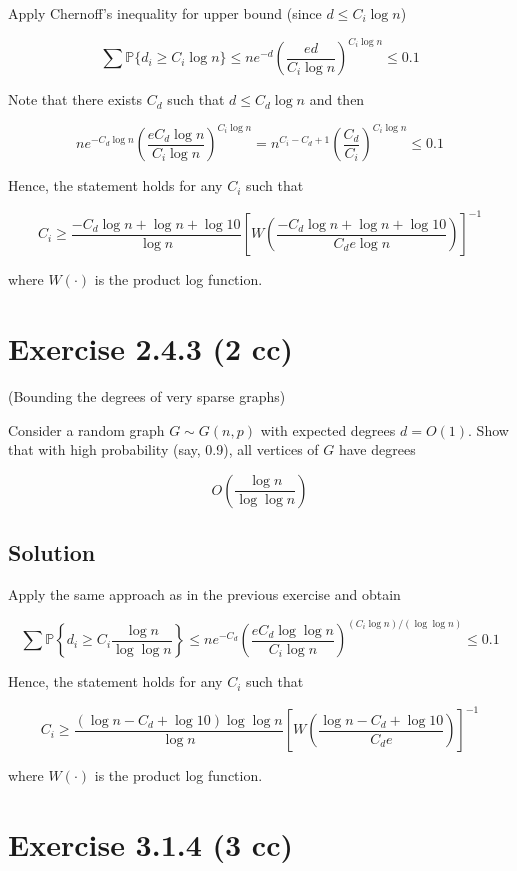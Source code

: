 \documentclass{article}
\begin{document}
Apply Chernoff’s inequality for upper bound (since $d \leq C_i \log n$)

$$ \sum \mathbb P \{ d_i \geq C_i \log n \} \leq n e^{-d} \left(\frac{e d}{C_i \log n}\right)^{C_i \log n} \leq 0.1$$

Note that there exists $C_d$ such that $d \leq C_d \log n$ and then

$$n e^{-C_d \log n} \left(\frac{e C_d \log n}{C_i \log n}\right)^{C_i \log n} = n^{C_i - C_d + 1} \left(\frac{C_d}{C_i}\right)^{C_i \log n} \leq 0.1$$

Hence, the statement holds for any $C_i$ such that

$$C_i \geq \frac{-C_d \log n + \log n + \log 10}{\log n } \left[W \left(\frac{-C_d \log n + \log n + \log 10}{C_d e \log n}\right)\right]^{-1}$$

where $W(\cdot)$ is the product log function.

\section{Exercise 2.4.3 (2 cc)}

(Bounding the degrees of very sparse graphs)

Consider a random graph $G \sim G(n, p)$ with expected degrees $d = O(1)$. Show that with high probability (say, 0.9), all vertices of $G$ have degrees

$$O\left(\frac{\log n}{\log \log n}\right)$$

\subsection{Solution}

Apply the same approach as in the previous exercise and obtain

$$ \sum \mathbb P \left\{ d_i \geq C_i \frac{\log n}{\log \log n} \right\} \leq n e^{-C_d} \left(\frac{e C_d \log \log n}{C_i \log n}\right)^{(C_i \log n) / (\log \log n)} \leq 0.1$$

Hence, the statement holds for any $C_i$ such that

$$C_i \geq \frac{(\log n - C_d + \log 10)\log \log n}{\log n} \left[W\left( \frac{\log n - C_d + \log 10}{C_d e} \right)\right]^{-1}$$

where $W(\cdot)$ is the product log function.

\section{Exercise 3.1.4 (3 cc)}
\end{document}
